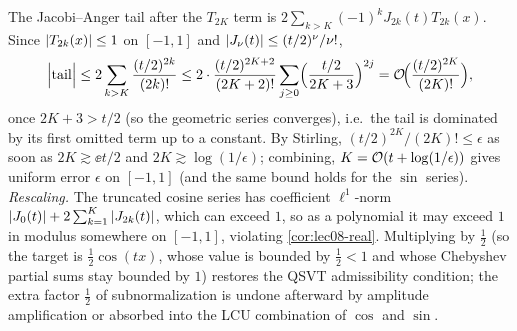 \begin{solution}
The Jacobi--Anger tail after the $T_{2K}$ term is
$2\sum_{k>K}(-1)^k J_{2k}(t)T_{2k}(x)$. Since $\left\lvert T_{2k}(x) \right\rvert\le1$ on $[-1,1]$ and
$\left\lvert J_\nu(t) \right\rvert\le(t/2)^\nu/\nu!$,
\[
  \Bigl|\text{tail}\Bigr|\le2\sum_{k>K}\frac{(t/2)^{2k}}{(2k)!}
  \le2\cdot\frac{(t/2)^{2K+2}}{(2K+2)!}\sum_{j\ge0}\Bigl(\frac{t/2}{2K+3}\Bigr)^{2j}
  =\mathcal{O}\!\Bigl(\frac{(t/2)^{2K}}{(2K)!}\Bigr),
\]
once $2K+3>t/2$ (so the geometric series converges), i.e.\ the tail is dominated by its
first omitted term up to a constant. By Stirling, $(t/2)^{2K}/(2K)!\le\epsilon$ as soon
as $2K\gtrsim\ee t/2$ and $2K\gtrsim\log(1/\epsilon)$; combining, $K=\mathcal{O}(t+\log
(1/\epsilon))$ gives uniform error $\epsilon$ on $[-1,1]$ (and the same bound holds for
the $\sin$ series). \emph{Rescaling.} The truncated cosine series has coefficient
$\ell^1$-norm $\left\lvert J_0(t) \right\rvert+2\sum_{k=1}^K\left\lvert J_{2k}(t) \right\rvert$, which can exceed $1$, so as a
polynomial it may exceed $1$ in modulus somewhere on $[-1,1]$, violating
\cref{cor:lec08-real}. Multiplying by $\tfrac12$ (so the target is $\tfrac12\cos(tx)$,
whose value is bounded by $\tfrac12<1$ and whose Chebyshev partial sums stay bounded by
$1$) restores the QSVT admissibility condition; the extra factor $\tfrac12$ of
subnormalization is undone afterward by amplitude amplification or absorbed into the
LCU combination of $\cos$ and $\sin$.
\end{solution}

